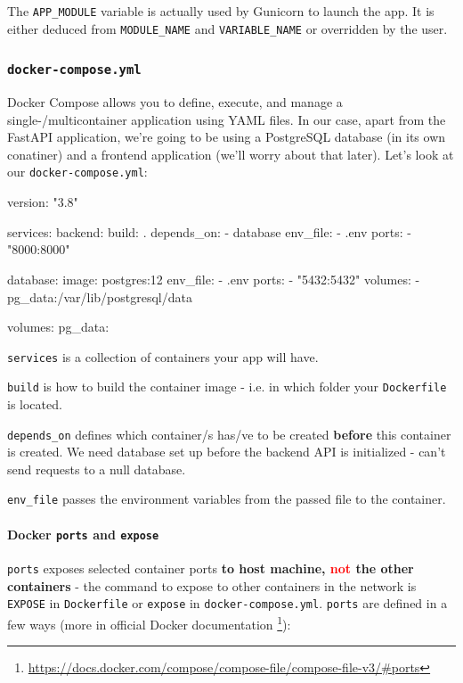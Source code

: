 \documentclass{article}
\newcommand{\flink}[1]{\footnote{\href{#1}{#1}}}
\newcommand{\dockerinline}[1]{\lstinline[language=docker, style=cstyle, basicstyle=\ttfamily\normalsize]{#1}}
\begin{document}
The \texttt{APP\_MODULE} variable is actually used by Gunicorn to launch the app. It is either deduced from \texttt{MODULE\_NAME} and \texttt{VARIABLE\_NAME} or overridden by the user.

\subsubsection{\texttt{docker-compose.yml}\label{preparations:dockercompose}}

Docker Compose allows you to define, execute, and manage a single-/multicontainer application using YAML files. In our case, apart from the FastAPI application, we're going to be using a PostgreSQL database (in its own conatiner) and a frontend application (we'll worry about that later). Let's look at our \texttt{docker-compose.yml}:

\begin{dockercode}
version: "3.8"

services:
    backend:
        build: .
        depends_on:
            - database
        env_file:
            - .env
        ports:
            - "8000:8000"

    database:
        image: postgres:12
        env_file:
            - .env
        ports:
            - "5432:5432"
        volumes:
            - pg_data:/var/lib/postgresql/data

volumes:
    pg_data:
\end{dockercode}

\dockerinline{services} is a collection of containers your app will have.

\dockerinline{build} is how to build the container image - i.e. in which folder your \texttt{Dockerfile} is located.

\dockerinline{depends_on} defines which container/s has/ve to be created \textbf{before} this container is created. We need database set up before the backend API is initialized - can't send requests to a null database.

\dockerinline{env_file} passes the environment variables from the passed file to the container.

\paragraph{Docker \dockerinline{ports} and \dockerinline{expose}}

\dockerinline{ports} exposes selected container ports \textbf{to host machine, \textcolor{red}{not} the other containers} - the command to expose to other containers in the network is \dockerinline{EXPOSE} in \texttt{Dockerfile} or \dockerinline{expose} in \texttt{docker-compose.yml}. \dockerinline{ports} are defined in a few ways (more in official Docker documentation \flink{https://docs.docker.com/compose/compose-file/compose-file-v3/\#ports}):
\end{document}
